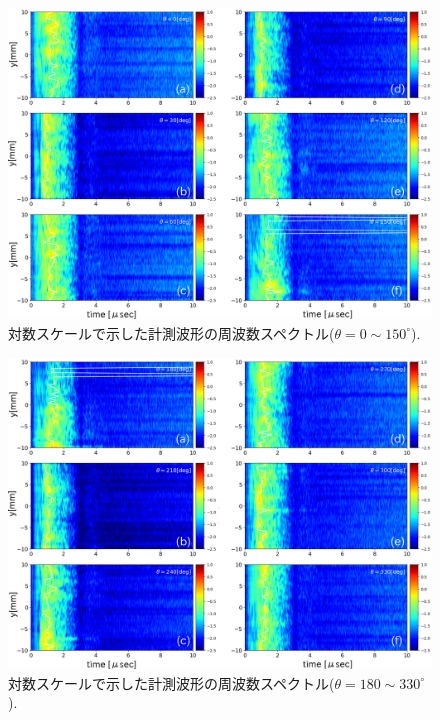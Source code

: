 \begin{figure}[h]
	\begin{center}
	\includegraphics[width=1.0\linewidth]{Figs/fig17.eps} 
	\end{center}
	\caption{
		対数スケールで示した計測波形の周波数スペクトル($\theta=0\sim 150^{\circ}$).
	} 
	\label{fig:fig17}
\end{figure}
\begin{figure}[h]
	\begin{center}
	\includegraphics[width=1.0\linewidth]{Figs/fig18.eps} 
	\end{center}
	\caption{
		対数スケールで示した計測波形の周波数スペクトル($\theta=180\sim 330^{\circ}$).
	} 
	\label{fig:fig18}
\end{figure}

